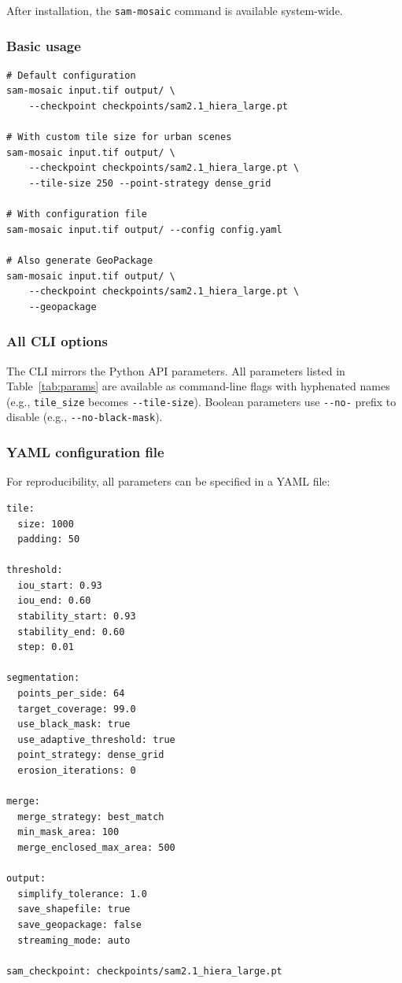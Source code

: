 \documentclass[review,11pt,authoryear]{elsarticle}
\begin{document}
After installation, the \texttt{sam-mosaic} command is available system-wide.

\subsubsection{Basic usage}

\begin{lstlisting}[style=bash]
# Default configuration
sam-mosaic input.tif output/ \
    --checkpoint checkpoints/sam2.1_hiera_large.pt

# With custom tile size for urban scenes
sam-mosaic input.tif output/ \
    --checkpoint checkpoints/sam2.1_hiera_large.pt \
    --tile-size 250 --point-strategy dense_grid

# With configuration file
sam-mosaic input.tif output/ --config config.yaml

# Also generate GeoPackage
sam-mosaic input.tif output/ \
    --checkpoint checkpoints/sam2.1_hiera_large.pt \
    --geopackage
\end{lstlisting}

\subsubsection{All CLI options}

The CLI mirrors the Python API parameters. All parameters listed in Table~\ref{tab:params} are available as command-line flags with hyphenated names (e.g., \texttt{tile\_size} becomes \texttt{-{}-tile-size}). Boolean parameters use \texttt{-{}-no-} prefix to disable (e.g., \texttt{-{}-no-black-mask}).

\subsubsection{YAML configuration file}

For reproducibility, all parameters can be specified in a YAML file:

\begin{lstlisting}[style=yaml]
tile:
  size: 1000
  padding: 50

threshold:
  iou_start: 0.93
  iou_end: 0.60
  stability_start: 0.93
  stability_end: 0.60
  step: 0.01

segmentation:
  points_per_side: 64
  target_coverage: 99.0
  use_black_mask: true
  use_adaptive_threshold: true
  point_strategy: dense_grid
  erosion_iterations: 0

merge:
  merge_strategy: best_match
  min_mask_area: 100
  merge_enclosed_max_area: 500

output:
  simplify_tolerance: 1.0
  save_shapefile: true
  save_geopackage: false
  streaming_mode: auto

sam_checkpoint: checkpoints/sam2.1_hiera_large.pt
\end{lstlisting}
\end{document}
